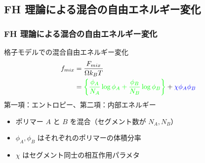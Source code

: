 \documentclass[12pt, dvipdfmx]{beamer}
\begin{document}
\subsection{FH 理論による混合の自由エネルギー変化}
\begin{frame}\frametitle{FH 理論による混合の自由エネルギー変化}
	格子モデルでの混合自由エネルギー変化
	\vspace{-0.5\baselineskip}
	\begin{align*}
	f_{mix} &= \dfrac{F_{mix}}{\Omega k_B T} \notag \\
	&= \color{green}\left\{ \dfrac{\phi_A}{N_A} \log \phi_A 
	+ \dfrac{\phi_B}{N_B} \log \phi_B \right\} \color{black} 
	+ \color{blue}\chi \phi_A \phi_B \color{black}
	\end{align*}
	\color{green}第一項：エントロピー\color{black}、\color{blue}第二項：内部エネルギー\color{black}
	\begin{itemize}
	\item  ポリマー $A$ と $B$ を混合（セグメント数が $N_A, N_B$）
	\item $\phi_A, \phi_B$ はそれぞれのポリマーの体積分率
	\item $\chi$ はセグメント同士の\color{red}相互作用パラメタ\color{black}
	\end{itemize}	
\end{frame}
\end{document}

